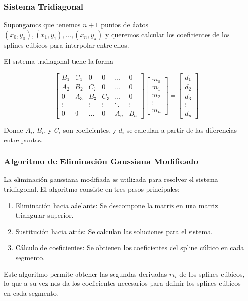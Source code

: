 \documentclass{beamer}
\begin{document}
\begin{frame}
	\frametitle{Sistema Tridiagonal}
	Supongamos que tenemos $n+1$ puntos de datos $(x_0, y_0), (x_1, y_1), \ldots, (x_n, y_n)$ y queremos calcular los coeficientes de los splines cúbicos para interpolar entre ellos.
	
	El sistema tridiagonal tiene la forma:
	
	\[
	\begin{bmatrix}
		B_1 & C_1 & 0 & 0 & \ldots & 0 \\
		A_2 & B_2 & C_2 & 0 & \ldots & 0 \\
		0 & A_3 & B_3 & C_3 & \ldots & 0 \\
		\vdots & \vdots & \vdots & \vdots & \ddots & \vdots \\
		0 & 0 & \ldots & 0 & A_n & B_n
	\end{bmatrix}
	\begin{bmatrix}
		m_0 \\
		m_1 \\
		m_2 \\
		\vdots \\
		m_n
	\end{bmatrix}
	=
	\begin{bmatrix}
		d_1 \\
		d_2 \\
		d_3 \\
		\vdots \\
		d_n
	\end{bmatrix}
	\]
	
	Donde $A_i$, $B_i$, y $C_i$ son coeficientes, y $d_i$ se calculan a partir de las diferencias entre puntos.
\end{frame}

\begin{frame}
	\frametitle{Algoritmo de Eliminación Gaussiana Modificado}
	La eliminación gaussiana modifiada es utilizada para resolver el sistema tridiagonal. El algoritmo consiste en tres pasos principales:
	
	\begin{enumerate}
		\item Eliminación hacia adelante: Se descompone la matriz en una matriz triangular superior.
		\item Sustitución hacia atrás: Se calculan las soluciones para el sistema.
		\item Cálculo de coeficientes: Se obtienen los coeficientes del spline cúbico en cada segmento.
	\end{enumerate}
	
	Este algoritmo permite obtener las segundas derivadas $m_i$ de los splines cúbicos, lo que a su vez nos da los coeficientes necesarios para definir los splines cúbicos en cada segmento.
\end{frame}
\end{document}
